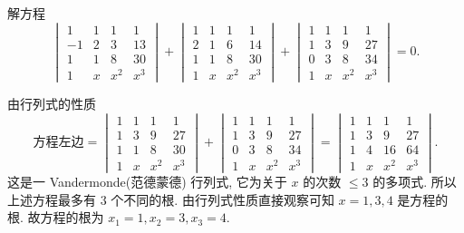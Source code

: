 \documentclass[../../main.tex]{subfiles}%
\begin{document}
\begin{example}
解方程
\[
\begin{vmatrix} 1 & 1 & 1 & 1 \\ -1 & 2 & 3 & 13 \\ 1 & 1 & 8 & 30 \\ 1 & x & x^2 & x^3 \end{vmatrix} + \begin{vmatrix} 1 & 1 & 1 & 1 \\ 2 & 1 & 6 & 14 \\ 1 & 1 & 8 & 30 \\ 1 & x & x^2 & x^3 \end{vmatrix} + \begin{vmatrix} 1 & 1 & 1 & 1 \\ 1 & 3 & 9 & 27 \\ 0 & 3 & 8 & 34 \\ 1 & x & x^2 & x^3 \end{vmatrix} = 0.
\]
\end{example}
\begin{solution}
由行列式的性质
\[
\text{方程左边} = \begin{vmatrix} 1 & 1 & 1 & 1 \\ 1 & 3 & 9 & 27 \\ 1 & 1 & 8 & 30 \\ 1 & x & x^2 & x^3 \end{vmatrix} + \begin{vmatrix} 1 & 1 & 1 & 1 \\ 1 & 3 & 9 & 27 \\ 0 & 3 & 8 & 34 \\ 1 & x & x^2 & x^3 \end{vmatrix} = \begin{vmatrix} 1 & 1 & 1 & 1 \\ 1 & 3 & 9 & 27 \\ 1 & 4 & 16 & 64 \\ 1 & x & x^2 & x^3 \end{vmatrix}.
\]
这是一 Vandermonde(范德蒙德) 行列式, 它为关于 \(x\) 的次数 \(\leqslant 3\) 的多项式. 所以上述方程最多有 \(3\) 个不同的根. 由行列式性质直接观察可知 \(x = 1, 3, 4\) 是方程的根. 故方程的根为 \(x_1 = 1, x_2 = 3, x_3 = 4\).

\end{solution}
\end{document}
